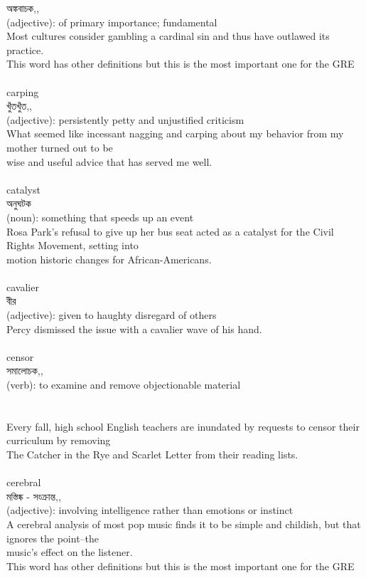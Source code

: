 \documentclass{article}
\begin{document}
{অঙ্কবাচক,,}\\
{(adjective): of primary importance; fundamental\\Most cultures consider gambling a cardinal sin and thus have outlawed its practice.\\This word has other definitions but this is the most important one for the GRE\\}\\
{carping}\\
{খুঁতখুঁত,,}\\
{(adjective): persistently petty and unjustified criticism\\What seemed like incessant nagging and carping about my behavior from my mother turned out to be\\wise and useful advice that has served me well.\\}\\
{catalyst}\\
{অনুঘটক}\\
{(noun): something that speeds up an event\\Rosa Park's refusal to give up her bus seat acted as a catalyst for the Civil Rights Movement, setting into\\motion historic changes for African-Americans.\\}\\
{cavalier}\\
{বীর}\\
{(adjective): given to haughty disregard of others\\Percy dismissed the issue with a cavalier wave of his hand.\\}\\
{censor}\\
{সমালোচক,,}\\
{(verb): to examine and remove objectionable material\\\\                                                                                \\Every fall, high school English teachers are inundated by requests to censor their curriculum by removing\\The Catcher in the Rye and Scarlet Letter from their reading lists.\\}\\
{cerebral}\\
{মস্তিষ্ক - সংক্রান্ত,,}\\
{(adjective): involving intelligence rather than emotions or instinct\\A cerebral analysis of most pop music finds it to be simple and childish, but that ignores the point--the\\music's effect on the listener.\\This word has other definitions but this is the most important one for the GRE\\}\\
\end{document}
